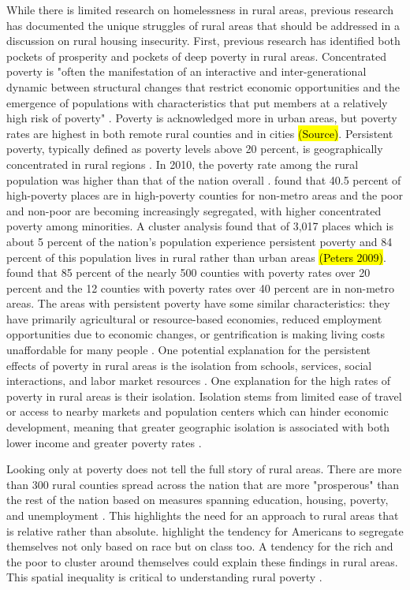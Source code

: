  While there is limited research on homelessness in rural areas, previous research has documented the unique struggles of rural areas that should be addressed in a discussion on rural housing insecurity. First, previous research has identified both pockets of prosperity and pockets of deep poverty in rural areas. Concentrated poverty is "often the manifestation of an interactive and inter-generational dynamic between structural changes that restrict economic opportunities and the emergence of populations with characteristics that put members at a relatively high risk of poverty" \citep[?]{thiede_spatial_2018}. Poverty is acknowledged more in urban areas, but poverty rates are highest in both remote rural counties and in cities \hl{(Source)}. Persistent poverty, typically defined as poverty levels above 20 percent, is geographically concentrated in rural regions \citep{crandall_local_2004}. In 2010, the poverty rate among the rural population was higher than that of the nation overall \citep{burton_inequality_2013}. \citet{lichter_rural_2011} found that 40.5 percent of high-poverty places are in high-poverty counties for non-metro areas and the poor and non-poor are becoming increasingly segregated, with higher concentrated poverty among minorities. A cluster analysis found that of 3,017 places which is about 5 percent of the nation's population experience persistent poverty and 84 percent of this population lives in rural rather than urban areas \hl{(Peters 2009)}. \citep{lichter_changing_2007} found that 85 percent of the nearly 500 counties with poverty rates over 20 percent and the 12 counties with poverty rates over 40 percent are in non-metro areas. The areas with persistent poverty have some similar characteristics: they have primarily agricultural or resource-based economies, reduced employment opportunities due to economic changes, or gentrification is making living costs unaffordable for many people \citep{robertson_rural_2007}. One potential explanation for the persistent effects of poverty in rural areas is the isolation from schools, services, social interactions, and labor market resources \citep{canto_rural_2014}. One explanation for the high rates of poverty in rural areas is their isolation. Isolation stems from limited ease of travel or access to nearby markets and population centers which can hinder economic development, meaning that greater geographic isolation is associated with both lower income and greater poverty rates \citep{blank_poverty_2005}. 
 
 Looking only at poverty does not tell the full story of rural areas. There are more than 300 rural counties spread across the nation that are more "prosperous" than the rest of the nation based on measures spanning education, housing, poverty, and unemployment \citep{isserman_why_2009}.  This highlights the need for an approach to rural areas that is relative rather than absolute. \citep{metzger_fair_2017} highlight the tendency for Americans to segregate themselves not only based on race but on class too. A tendency for the rich and the poor to cluster around themselves could explain these findings in rural areas. This spatial inequality is critical to understanding rural poverty \citep{thiede_spatial_2018}. %

